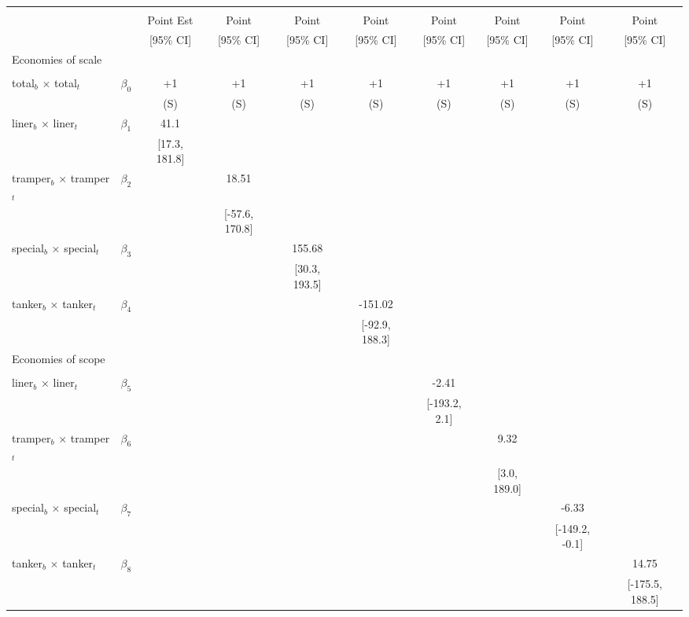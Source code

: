 \begin{tabular}{@{\extracolsep{5pt}}lccccccccc}
\toprule 
 &  &  &  &  &  &  &  &  &  \\
 &  & Point Est & Point & Point & Point & Point & Point & Point & Point \\
 &  & [95\% CI] & [95\% CI] & [95\% CI] & [95\% CI] & [95\% CI] & [95\% CI] & [95\% CI] & [95\% CI] \\
\midrule 
Economies of scale &  &  &  &  &  &  &  \\
 &  &  &  &  &  &  &  &  \\
total$_{b}$ $\times$ total$_{t}$ & $\beta_0$ & +1 & +1 & +1 & +1 & +1 & +1 & +1 & +1 \\
 &  & (S) & (S) & (S) & (S) & (S) & (S) & (S) & (S) \\
liner$_{b}$ $\times$ liner$_{t}$ & $\beta_1$ & 41.1 &  &  &  &  &  &  &  \\
 &  & [17.3, 181.8] &  &  &  &  &  &  &  \\
tramper$_{b}$ $\times$ tramper$_{t}$ & $\beta_2$ &  & 18.51 &  &  &  &  &  &  \\
 &  &  & [-57.6, 170.8] &  &  &  &  &  &  \\
special$_{b}$ $\times$ special$_{t}$ & $\beta_3$ &  &  & 155.68 &  &  &  &  &  \\
 &  &  &  & [30.3, 193.5] &  &  &  &  &  \\
tanker$_{b}$ $\times$ tanker$_{t}$ & $\beta_4$ &  &  &  & -151.02 &  &  &  &  \\
 &  &  &  &  & [-92.9, 188.3] &  &  &  &  \\
Economies of scope &  &  &  &  &  &  &  &  &  \\
 &  &  &  &  &  &  &  &  &  \\
liner$_{b}$ $\times$ liner$_{t}$ & $\beta_5$ &  &  &  &  & -2.41 &  &  &  \\
 &  &  &  &  &  & [-193.2, 2.1] &  &  &  \\
tramper$_{b}$ $\times$ tramper$_{t}$ & $\beta_6$ &  &  &  &  &  & 9.32 &  &  \\
 &  &  &  &  &  &  & [3.0, 189.0] &  &  \\
special$_{b}$ $\times$ special$_{t}$ & $\beta_7$ &  &  &  &  &  &  & -6.33 &  \\
 &  &  &  &  &  &  &  & [-149.2, -0.1] &  \\
tanker$_{b}$ $\times$ tanker$_{t}$ & $\beta_8$ &  &  &  &  &  &  &  & 14.75 \\
 &  &  &  &  &  &  &  &  & [-175.5, 188.5] \\

\end{tabular}
